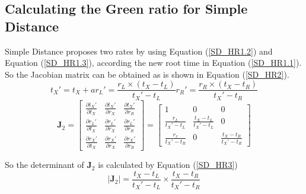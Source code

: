 \documentclass{bmcart}
\begin{document}
\begin{backmatter}
\subsection*{Calculating the Green ratio for Simple Distance}
Simple Distance proposes two rates by using Equation (\ref{SD_HR1.2}) and Equation (\ref{SD_HR1.3}), according the new root time in Equation (\ref{SD_HR1.1}). So the Jacobian matrix can be obtained as is shown in Equation (\ref{SD_HR2}).
\begin{subequations}\label{SD_HR1}
\begin{equation}\label{SD_HR1.1}
 {t_X}' = {t_X} + a
\end{equation}  
\begin{equation} \label{SD_HR1.2}
{r_L}' = \frac{{{r_L} \times ({t_X} - {t_L})}}{{{t_X}' - {t_L}}} 
\end{equation}  
\begin{equation}\label{SD_HR1.3}
  {r_R}' = \frac{{{r_R} \times ({t_X} - {t_R})}}{{{t_X}' - {t_R}}} 
\end{equation}  
\end{subequations}
\begin{equation}\label{SD_HR2}
{{\mathbf{J}}_2} = \left[ {\begin{array}{*{20}{c}}
  {\frac{{\partial {t_X}'}}{{\partial {t_X}}}}&{\frac{{\partial {t_X}'}}{{\partial {r_X}}}}&{\frac{{\partial {t_X}'}}{{\partial {r_R}}}} \\ 
  {\frac{{\partial {r_L}'}}{{\partial {t_X}}}}&{\frac{{\partial {r_L}'}}{{\partial {r_X}}}}&{\frac{{\partial {r_L}'}}{{\partial {r_R}}}} \\ 
  {\frac{{\partial {r_X}'}}{{\partial {t_X}}}}&{\frac{{\partial {r_X}'}}{{\partial {r_X}}}}&{\frac{{\partial {r_X}'}}{{\partial {r_R}}}} 
\end{array}} \right] = \left[ {\begin{array}{*{20}{c}}
  1&0&0 \\ 
  {\frac{{{r_L}}}{{{t_X}' - {t_L}}}}&{\frac{{{t_X} - {t_L}}}{{{t_X}' - {t_L}}}}&0 \\ 
  {\frac{{{r_x}}}{{{t_X}' - {t_R}}}}&0&{\frac{{{t_X} - {t_R}}}{{{t_X}' - {t_R}}}} 
\end{array}} \right]
\end{equation}

So the determinant of ${{\mathbf{J}}_2}$ is calculated by Equation (\ref{SD_HR3})
\begin{equation}\label{SD_HR3}
\left| {{{\mathbf{J}}_2}} \right| = \frac{{{t_X} - {t_L}}}{{{t_X}' - {t_L}}} \times \frac{{{t_X} - {t_R}}}{{{t_X}' - {t_R}}}
\end{equation}

\end{backmatter}
\end{document}
